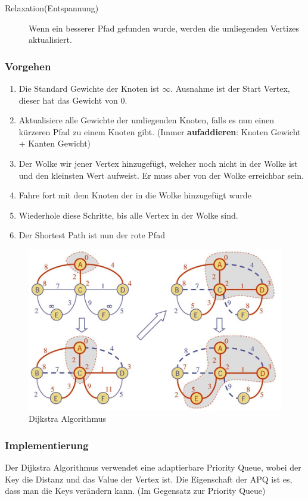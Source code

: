 \begin{description}
	\item[Relaxation(Entspannung)] Wenn ein besserer Pfad gefunden wurde, werden die umliegenden Vertizes aktualisiert.
\end{description}

\subsubsection{Vorgehen}
\begin{enumerate}
	\item Die Standard Gewichte der Knoten ist $\infty$. Ausnahme ist der Start Vertex, dieser hat das Gewicht von 0.
	\item Aktualisiere alle Gewichte der umliegenden Knoten, falls es nun einen kürzeren Pfad zu einem Knoten gibt. (Immer \textbf{aufaddieren}: Knoten Gewicht + Kanten Gewicht)
	\item Der Wolke wir jener Vertex hinzugefügt, welcher noch nicht in der Wolke ist und den kleinsten Wert aufweist. Er muss aber von der Wolke erreichbar sein.
	\item Fahre fort mit dem Knoten der in die Wolke hinzugefügt wurde
	\item Wiederhole diese Schritte, bis alle Vertex in der Wolke sind. 
	\item Der Shortest Path ist nun der rote Pfad
\end{enumerate}

\vfill

\begin{figure}[h]
\centering
\includegraphics[width=0.6\linewidth]{images/dijkstra_algorithm}
\caption{Dijkstra Algorithmus}
\label{fig:dijkstraalgorithm}
\end{figure}

\subsubsection{Implementierung}
Der Dijkstra Algorithmus verwendet eine adaptierbare Priority Queue, wobei der Key die Distanz und das Value der Vertex ist. Die Eigenschaft der APQ ist es, dass man die Keys verändern kann. (Im Gegensatz zur Priority Queue)


